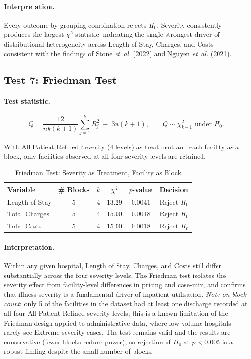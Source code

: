 \documentclass[12pt]{article}
\begin{document}
\paragraph{Interpretation.}
Every outcome-by-grouping combination rejects $H_0$. Severity
consistently produces the largest $\chi^2$ statistic, indicating the
single strongest driver of distributional heterogeneity across Length of Stay,
Charges, and Costs---consistent with the findings of Stone
\textit{et~al.} (2022) and Nguyen \textit{et~al.} (2021).

\subsection{Test 7: Friedman Test}

\paragraph{Test statistic.}
\[
  Q = \frac{12}{nk(k+1)} \sum_{j=1}^{k} R_j^2 \;-\; 3n(k+1),
  \qquad Q \sim \chi^2_{k-1}\text{ under }H_0.
\]

With All Patient Refined Severity (4 levels) as treatment and each facility as a block,
only facilities observed at all four severity levels are retained.

\begin{table}[H]
\centering
\caption{Friedman Test: Severity as Treatment, Facility as Block}
\label{tab:friedman}
\begin{tabular}{l c c c c l}
\toprule
\textbf{Variable} & \textbf{\# Blocks} & \textbf{$k$} & \textbf{$\chi^2$} & \textbf{$p$-value} & \textbf{Decision} \\
\midrule
Length of Stay  & 5 & 4 & 13.29 & $0.0041$ & Reject $H_0$ \\
Total Charges   & 5 & 4 & 15.00 & $0.0018$ & Reject $H_0$ \\
Total Costs     & 5 & 4 & 15.00 & $0.0018$ & Reject $H_0$ \\
\bottomrule
\end{tabular}
\end{table}

\paragraph{Interpretation.}
Within any given hospital, Length of Stay, Charges, and Costs still differ
substantially across the four severity levels. The Friedman test
isolates the severity effect from facility-level differences in pricing
and case-mix, and confirms that illness severity is a fundamental
driver of inpatient utilisation. \textit{Note on block count}: only 5
of the facilities in the dataset had at least one discharge recorded
at all four All Patient Refined severity levels; this is a known limitation of the
Friedman design applied to administrative data, where low-volume
hospitals rarely see Extreme-severity cases. The test remains valid
and the results are conservative (fewer blocks reduce power), so
rejection of $H_0$ at $p<0.005$ is a robust finding despite the small
number of blocks.
\end{document}

